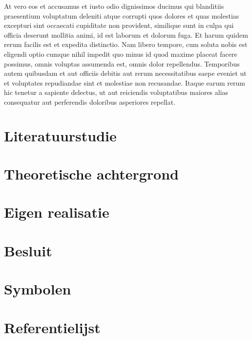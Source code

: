 \documentclass[a4paper,11pt,twoside,openright,english]{uamasterthesis}
\begin{document}
At vero eos et accusamus et iusto odio dignissimos ducimus qui
blanditiis praesentium voluptatum deleniti atque corrupti quos dolores
et quas molestias excepturi sint occaecati cupiditate non provident,
similique sunt in culpa qui officia deserunt mollitia animi, id est
laborum et dolorum fuga. Et harum quidem rerum facilis est et expedita
distinctio. Nam libero tempore, cum soluta nobis est eligendi optio
cumque nihil impedit quo minus id quod maxime placeat facere possimus,
omnis voluptas assumenda est, omnis dolor repellendus. Temporibus
autem quibusdam et aut officiis debitis aut rerum necessitatibus saepe
eveniet ut et voluptates repudiandae sint et molestiae non
recusandae. Itaque earum rerum hic tenetur a sapiente delectus, ut aut
reiciendis voluptatibus maiores alias consequatur aut perferendis
doloribus asperiores repellat.

\chapter{Literatuurstudie}

\chapter{Theoretische achtergrond}

\chapter{Eigen realisatie}

\chapter{Besluit}

\backmatter
\appendix

\chapter{Symbolen}
\chapter{Referentielijst}

\makefinalpage
\end{document}

